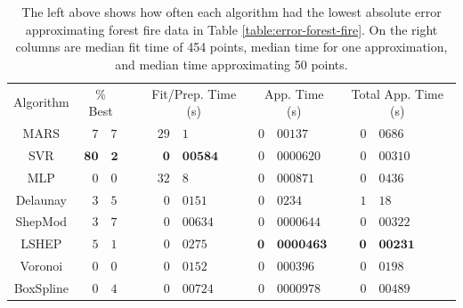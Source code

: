 \documentclass[smallextended,final]{svjour3}  %
\begin{document}
\begin{appendix}
\begin{table}[H]
  \centering
  \begin{tabular}{|c|r@{.}l| c |r@{.}l|r@{.}l|r@{.}l|}
    \cline{1-3}\cline{5-10}
    Algorithm & \multicolumn{2}{c|}{\% Best} &  & \multicolumn{2}{c|}{Fit/Prep. Time (s)} & \multicolumn{2}{c|}{App. Time (s)} & \multicolumn{2}{c|}{Total App. Time (s)}\\
    \cline{1-3}\cline{5-10}
    MARS & \quad$\mathit{7}$&$\mathit{7}$ &  & \quad\quad$29$&$1$ & \quad$0$&$00137$ & \quad\quad\quad$0$&$0686$\\
    SVR & $\mathbf{80}$&$\mathbf{2}$ &  & $\mathbf{0}$&$\mathbf{00584}$ & $\mathit{0}$&$\mathit{0000620}$ & $\mathit{0}$&$\mathit{00310}$\\
    MLP & $0$&$0$ &  & $32$&$8$ & $0$&$000871$ & $0$&$0436$\\
    Delaunay & $3$&$5$ &  & $0$&$0151$ & $0$&$0234$ & $1$&$18$\\
    ShepMod & $3$&$7$ &  & $\mathit{0}$&$\mathit{00634}$ & $0$&$0000644$ & $0$&$00322$\\
    LSHEP & $5$&$1$ &  & $0$&$0275$ & $\mathbf{0}$&$\mathbf{0000463}$ & $\mathbf{0}$&$\mathbf{00231}$\\
    Voronoi & $0$&$0$ &  & $0$&$0152$ & $0$&$000396$ & $0$&$0198$\\
    BoxSpline & $0$&$4$ &  & $0$&$00724$ & $0$&$0000978$ & $0$&$00489$\\
    \cline{1-3}\cline{5-10}
  \end{tabular}
  \caption{The left above shows how often each algorithm had the
    lowest absolute error approximating forest fire data in Table
    \ref{table:error-forest-fire}. On the right columns are median fit
    time of 454 points, median time for one approximation, and median
    time approximating 50 points.}
  \label{table:best-forest-fire}
\end{table}

\vspace*{\fill}
\newpage


\end{appendix}
\end{document}
